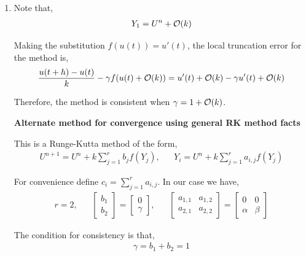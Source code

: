 \documentclass[10pt]{article}
\begin{document}
\begin{solution}[Solution]
\begin{enumerate}[label=(\alph*)]
    \item 
        Note that,
        \begin{align*}
            Y_1 = U^n + \mathcal{O}(k)
        \end{align*}
        
        Making the substitution \( f(u(t)) = u'(t) \), the local truncation error for the method is,
        \begin{align*}
            \frac{u(t+h)-u(t)}{k} - \gamma f(u(t)+\mathcal{O}(k)) = u'(t) + \mathcal{O}(k) - \gamma u'(t) + \mathcal{O}(k)
        \end{align*}
        
        Therefore, the method is consistent when \( \gamma = 1 + \mathcal{O}(k) \).

        \hrulefill

        \textbf{Alternate method for convergence using general RK method facts}
        
        This is a Runge-Kutta method of the form,
        \begin{align*}
            U^{n+1} = U^n + k \sum_{j=1}^{r}b_j f(Y_j)
            ,&&
            Y_i = U^n + k \sum_{j=1}^{r} a_{i,j} f(Y_j)
        \end{align*}

        For convenience define \( c_i = \sum_{j=1}^{r} a_{i,j} \).
        In our case we have,
        \begin{align*}
            r=2, && 
            \left[\begin{array}{c}b_1\\b_2\end{array}\right]
                =
            \left[\begin{array}{c}0\\\gamma\end{array}\right]
            ,&&
            \left[\begin{array}{cc}a_{1,1} & a_{1,2} \\ a_{2,1} & a_{2,2}\end{array}\right]
            =
            \left[\begin{array}{cc}0 & 0 \\ \alpha & \beta \end{array}\right]
        \end{align*}

        
        The condition for consistency is that,
        \begin{align*}
            \gamma = b_1 + b_2 = 1
        \end{align*}
        

\end{enumerate}
\end{solution}
\end{document}
